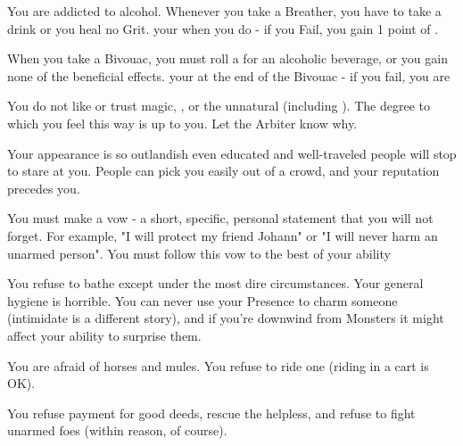 {    

    You are addicted to alcohol.  Whenever you take a Breather, you have to take a drink or you heal no Grit.  \RS your \VIG when you do - if you Fail, you gain 1 point of . 

    When you take a Bivouac, you must roll a \UD for an alcoholic beverage, or you gain none of the beneficial effects. \RS your \VIG at the end of the Bivouac - if you fail, you are 



    You do not like or trust magic, , or the unnatural (including ).  The degree to which you feel this way is up to you.  Let the Arbiter know why.


    Your appearance is so outlandish even educated and well-traveled people will stop to stare at you. People can pick you easily out of a crowd, and your reputation precedes you.

  
    You must make a vow - a short, specific, personal statement that you will not forget. For example, "I will protect my friend Johann" or "I will never harm an unarmed person".  You must follow this vow to the best of your ability


    You refuse to bathe except under the most dire circumstances.  Your general hygiene is horrible.  You can never use your Presence to charm someone (intimidate is a different story), and if you're downwind from Monsters it might affect your ability to surprise them.


    You are afraid of horses and mules.  You refuse to ride one (riding in a cart is OK).



    You refuse payment for good deeds, rescue the helpless, and refuse to fight unarmed foes (within reason, of course).  


}
